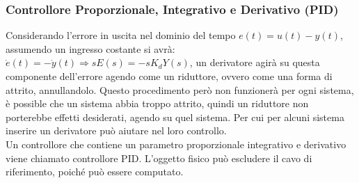\documentclass{article}
\numberwithin{equation}{subsection}
\begin{document}
\subsubsection{Controllore Proporzionale, Integrativo e Derivativo (PID)}

Considerando l'errore in uscita nel dominio del tempo $e(t)=u(t)-y(t)$, assumendo un ingresso costante si avrà: $\dot e(t)=-\dot y(t)\Rightarrow sE(s)=-sK_dY(s)$, 
un derivatore agirà su questa componente dell'errore agendo come un riduttore, ovvero come una forma di attrito, annullandolo. Questo procedimento 
però non funzionerà per ogni sistema, è possible che un sistema abbia troppo attrito, quindi un riduttore non porterebbe effetti desiderati, agendo su quel sistema. 
Per cui per alcuni sistema inserire un derivatore può aiutare nel loro controllo. \\
Un controllore che contiene un parametro proporzionale 
integrativo e derivativo viene chiamato controllore PID. L'oggetto fisico può escludere il cavo di riferimento, poiché può essere computato. 

\begin{center}\end{center}
\end{document}
